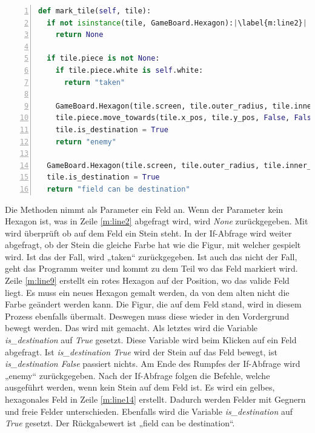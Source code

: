 \begin{lstlisting}[language=python,caption={Felder markieren},captionpos=b,label={lst:hexa:markieren},numbers=left,frame=none,escapechar=|]
def mark_tile(self, tile):
  if not isinstance(tile, GameBoard.Hexagon):|\label{m:line2}|
    return None

  if tile.piece is not None:
    if tile.piece.white is self.white:
      return "taken"

    GameBoard.Hexagon(tile.screen, tile.outer_radius, tile.inner_radius,tile.x_pos, tile.y_pos, (255, 0, 0))|\label{m:line9}|
    tile.piece.move_towards(tile.x_pos, tile.y_pos, False, False)
    tile.is_destination = True
    return "enemy"
  
  GameBoard.Hexagon(tile.screen, tile.outer_radius, tile.inner_radius, tile.x_pos, tile.y_pos, (249, 215, 28))|\label{m:line14}|
  tile.is_destination = True
  return "field can be destination"
\end{lstlisting}

Die Methoden nimmt als Parameter ein Feld an. Wenn der Parameter kein Hexagon ist, was in Zeile \ref{m:line2} abgefragt wird, wird \textit{None} zurückgegeben. Mit  wird überprüft ob auf dem Feld ein Stein steht. In der If-Abfrage wird weiter abgefragt, ob der Stein die gleiche Farbe hat wie die Figur, mit welcher gespielt wird. Ist das der Fall, wird „taken“ zurückgegeben. Ist auch das nicht der Fall, geht das Programm weiter und kommt zu dem Teil wo das Feld markiert wird. Zeile \ref{m:line9} erstellt ein rotes Hexagon auf der Position, wo das valide Feld liegt. Es muss ein neues Hexagon gemalt werden, da von dem alten nicht die Farbe geändert werden kann. Die Figur, die auf dem Feld stand, wird in diesem Prozess ebenfalls übermalt. Deswegen muss diese wieder in den Vordergrund bewegt werden. Das wird mit  gemacht. Als letztes wird die Variable \textit{is\_destination} auf \textit{True} gesetzt. Diese Variable wird beim Klicken auf ein Feld abgefragt. Ist \textit{is\_destination True} wird der Stein auf das Feld bewegt, ist \textit{is\_destination False} passiert nichts. Am Ende des Rumpfes der If-Abfrage wird „enemy“ zurückgegeben. Nach der If-Abfrage folgen die Befehle, welche ausgeführt werden, wenn kein Stein auf dem Feld ist. Es wird ein gelbes, hexagonales Feld in Zeile \ref{m:line14} erstellt. Dadurch werden Felder mit Gegnern und freie Felder unterschieden. Ebenfalls wird die Variable \textit{is\_destination} auf \textit{True} gesetzt. Der Rückgabewert ist „field can be destination“.

